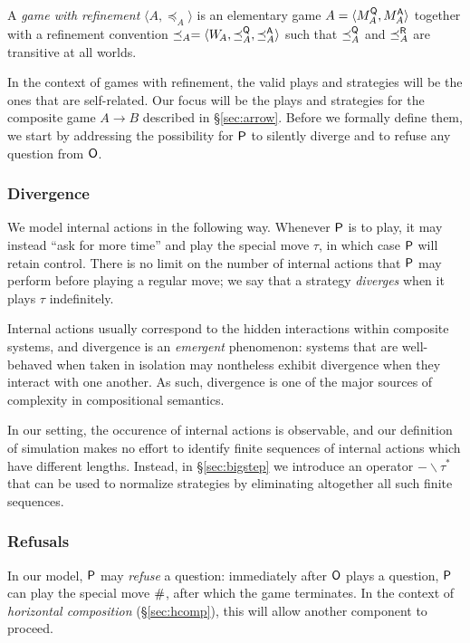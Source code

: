 \begin{definition}
A \emph{game with refinement} $\langle A, \preceq_A \rangle$
is an elementary game
$A = \langle M_A^{ \mathsf{Q} }, M_A^{ \mathsf{A} } \rangle$
together with a refinement convention
$\preceq_A = \langle W_{\!A}, \preceq_A^{ \mathsf{Q} }, \preceq_A^{ \mathsf{A} } \rangle$
such that $\preceq_A^{ \mathsf{Q} }$ and $\preceq_A^{ \mathsf{R} }$
are transitive at all worlds.
\end{definition}

In the context of games with refinement,
the valid plays and strategies will be the ones
that are self-related.
Our focus will be the plays and strategies
for the composite game $A \rightarrow B$
described in \S\ref{sec:arrow}.
Before we formally define them,
we start by addressing
the possibility for $ \mathsf{P} $ to silently diverge
and to refuse any question from $ \mathsf{O} $.

\subsubsection{Divergence}

We model internal actions in the following way.
Whenever $ \mathsf{P} $ is to play,
it may instead ``ask for more time''
and play the special move $\tau$,
in which case $ \mathsf{P} $ will retain control.
There is no limit on the number of internal actions that
$ \mathsf{P} $ may perform before playing a regular move;
we say that a strategy \emph{diverges}
when it plays $\tau$ indefinitely.

Internal actions usually correspond to the hidden interactions
within composite systems, and
divergence is an \emph{emergent} phenomenon:
systems that are well-behaved when taken in isolation
may nontheless exhibit divergence when they interact with one another.
As such,
divergence is one of the major sources of complexity
in compositional semantics.

In our setting,
the occurence of internal actions
is observable,
and our definition of simulation
makes no effort
to identify finite sequences of internal actions
which have different lengths.
Instead,
in \S\ref{sec:bigstep}
we introduce an operator $- \backslash \tau^*$
that can be used to normalize strategies
by eliminating altogether all such finite sequences.

\subsubsection{Refusals}

In our model,
$ \mathsf{P} $ may \emph{refuse} a question:
immediately after $ \mathsf{O} $ plays a question,
$ \mathsf{P} $ can play the special move $ \mathsf{\#} $,
after which the game terminates.
In the context of
\emph{horizontal composition} (\S\ref{sec:hcomp}),
this will allow another component to proceed.

